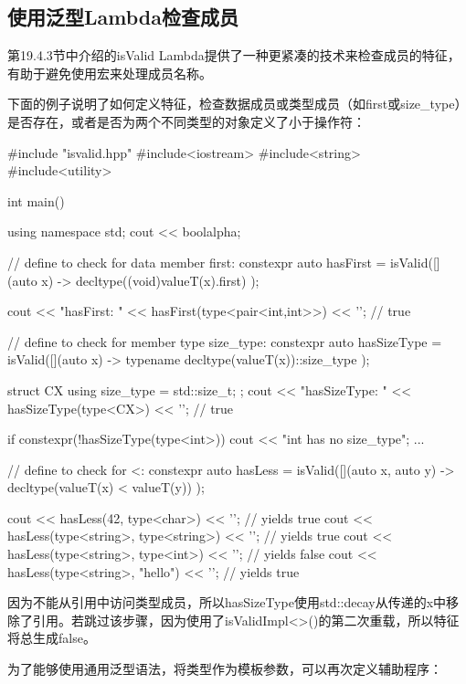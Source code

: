 \subsection{使用泛型Lambda检查成员}

第19.4.3节中介绍的isValid Lambda提供了一种更紧凑的技术来检查成员的特征，有助于避免使用宏来处理成员名称。

下面的例子说明了如何定义特征，检查数据成员或类型成员（如first或size\_type）是否存在，或者是否为两个不同类型的对象定义了小于操作符：

\begin{cpp}
#include "isvalid.hpp"
#include<iostream>
#include<string>
#include<utility>

int main() {
	using namespace std;
	cout << boolalpha;
	
	// define to check for data member first:
	constexpr auto hasFirst
		= isValid([](auto x) -> decltype((void)valueT(x).first) {
				});

	cout << "hasFirst: " << hasFirst(type<pair<int,int>>) << '\n'; // true
	
	// define to check for member type size_type:
	constexpr auto hasSizeType
		= isValid([](auto x) -> typename decltype(valueT(x))::size_type {
				});
			
	struct CX {
		using size_type = std::size_t;
	};
	cout << "hasSizeType: " << hasSizeType(type<CX>) << '\n'; // true
	
	if constexpr(!hasSizeType(type<int>)) {
		cout << "int has no size_type\n";
		...
	}

	// define to check for <:
	constexpr auto hasLess
		= isValid([](auto x, auto y) -> decltype(valueT(x) < valueT(y)) {
				});
			
	cout << hasLess(42, type<char>) << '\n'; // yields true
	cout << hasLess(type<string>, type<string>) << '\n'; // yields true
	cout << hasLess(type<string>, type<int>) << '\n'; // yields false
	cout << hasLess(type<string>, "hello") << '\n'; // yields true
}
\end{cpp}

因为不能从引用中访问类型成员，所以hasSizeType使用std::decay从传递的x中移除了引用。若跳过该步骤，因为使用了isValidImpl<>()的第二次重载，所以特征将总生成false。

为了能够使用通用泛型语法，将类型作为模板参数，可以再次定义辅助程序：

